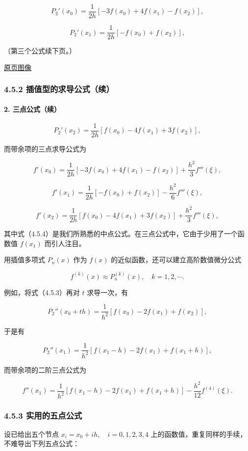 \documentclass[
  10pt,
  fontset=fandol]{ctexart}
\begin{document}
\[
P_2'(x_0)=\frac1{2h}[-3f(x_0)+4f(x_1)-f(x_2)],
\]

\[
P_2'(x_1)=\frac1{2h}[-f(x_0)+f(x_2)],
\]

（第三个公式续下页。）

\href{../../source-images/pdf-115.jpeg}{原页图像}

\subsubsection{4.5.2 插值型的求导公式（续）}\label{ux63d2ux503cux578bux7684ux6c42ux5bfcux516cux5f0fux7eed-1}

\paragraph{2. 三点公式（续）}\label{ux4e09ux70b9ux516cux5f0fux7eed}

\[
P_2'(x_2)=\frac1{2h}[f(x_0)-4f(x_1)+3f(x_2)],
\]

而带余项的三点求导公式为

\[
f'(x_0)=\frac1{2h}[-3f(x_0)+4f(x_1)-f(x_2)]+\frac{h^2}3f'''(\xi),
\]

\[
f'(x_1)=\frac1{2h}[-f(x_0)+f(x_2)]-\frac{h^2}6f'''(\xi),
\tag{4.5.4}
\]

\[
f'(x_2)=\frac1{2h}[f(x_0)-4f(x_1)+3f(x_2)]+\frac{h^2}3f'''(\xi),
\]

其中式（4.5.4）是我们所熟悉的中点公式。在三点公式中，它由于少用了一个函数值 \(f(x_1)\) 而引人注目。

用插值多项式 \(P_n(x)\) 作为 \(f(x)\) 的近似函数，还可以建立高阶数值微分公式

\[
f^{(k)}(x)\approx P_n^{(k)}(x),\quad k=1,2,\cdots.
\]

例如，将式（4.5.3）再对 \(t\) 求导一次，有

\[
P_2''(x_0+th)=\frac1{h^2}[f(x_0)-2f(x_1)+f(x_2)],
\]

于是有

\[
P_2''(x_1)=\frac1{h^2}[f(x_1-h)-2f(x_1)+f(x_1+h)],
\]

而带余项的二阶三点公式为

\[
f''(x_1)=\frac1{h^2}[f(x_1-h)-2f(x_1)+f(x_1+h)]-\frac{h^2}{12}f^{(4)}(\xi).
\tag{4.5.5}
\]

\subsubsection{4.5.3 实用的五点公式}\label{ux5b9eux7528ux7684ux4e94ux70b9ux516cux5f0f}

设已给出五个节点 \(x_i=x_0+ih,\allowbreak \quad i=0,\allowbreak 1,\allowbreak 2,\allowbreak 3,\allowbreak 4\) 上的函数值，重复同样的手续，不难导出下列五点公式：
\end{document}
